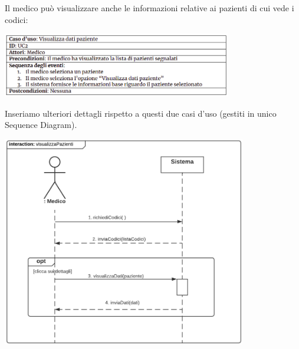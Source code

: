 \documentclass{article}
\begin{document}
\newpage
Il medico può visualizzare anche le informazioni relative ai pazienti di cui vede i codici:
\begin{center}
    \includegraphics[width=0.75\textwidth]{pictures/UC2.png}
\end{center}
Inseriamo ulteriori dettagli rispetto a questi due casi d'uso (gestiti in unico Sequence Diagram).
\begin{center}
    \includegraphics[width=0.80\textwidth]{pictures/SDMedico2_listaPazienti.png}
\end{center}
\end{document}
